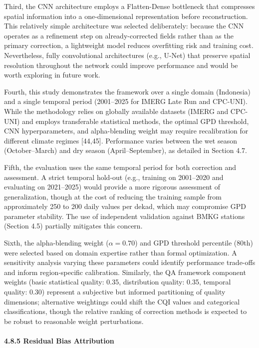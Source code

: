 \documentclass[
]{article}
\begin{document}
Third, the CNN architecture employs a Flatten-Dense bottleneck that
compresses spatial information into a one-dimensional representation
before reconstruction. This relatively simple architecture was selected
deliberately: because the CNN operates as a refinement step on
already-corrected fields rather than as the primary correction, a
lightweight model reduces overfitting risk and training cost.
Nevertheless, fully convolutional architectures (e.g., U-Net) that
preserve spatial resolution throughout the network could improve
performance and would be worth exploring in future work.

Fourth, this study demonstrates the framework over a single domain
(Indonesia) and a single temporal period (2001--2025 for IMERG Late Run
and CPC-UNI). While the methodology relies on globally available
datasets (IMERG and CPC-UNI) and employs transferable statistical
methods, the optimal GPD threshold, CNN hyperparameters, and
alpha-blending weight may require recalibration for different climate
regimes {[}44,45{]}. Performance varies between the wet season
(October--March) and dry season (April--September), as detailed in
Section 4.7.

Fifth, the evaluation uses the same temporal period for both correction
and assessment. A strict temporal hold-out (e.g., training on 2001--2020
and evaluating on 2021--2025) would provide a more rigorous assessment
of generalization, though at the cost of reducing the training sample
from approximately 250 to 200 daily values per dekad, which may
compromise GPD parameter stability. The use of independent validation
against BMKG stations (Section 4.5) partially mitigates this concern.

Sixth, the alpha-blending weight (\(\alpha = 0.70\)) and GPD threshold
percentile (80th) were selected based on domain expertise rather than
formal optimization. A sensitivity analysis varying these parameters
could identify performance trade-offs and inform region-specific
calibration. Similarly, the QA framework component weights (basic
statistical quality: 0.35, distribution quality: 0.35, temporal quality:
0.30) represent a subjective but informed partitioning of quality
dimensions; alternative weightings could shift the CQI values and
categorical classifications, though the relative ranking of correction
methods is expected to be robust to reasonable weight perturbations.

\paragraph{4.8.5 Residual Bias
Attribution}\label{residual-bias-attribution}
\end{document}
